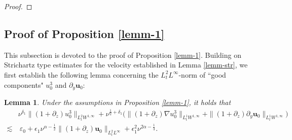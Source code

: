 \documentclass[11pt,reqno]{article}
\newtheorem{lemm}[theo]{Lemma}
\numberwithin{equation}{section}
\newcommand\Z{{\mathbb Z}}
\newcommand\W{{\mathcal W}}
\newcommand\uu{\bm{u}}
\newcommand\FF{\bm{F}}
\let\pa=\partial
\let\al=\alpha
\let\var=\varepsilon
\let\f=\frac
\let\ep=\epsilon
\begin{document}
\begin{proof}



\end{proof}





\subsection{Proof of Proposition \ref{lemm-1}}
This subsection is devoted to the proof of Proposition \ref{lemm-1}. 
Building on Strichartz type estimates for the velocity established in Lemma \ref{lemm-str}, %
we first  establish the following lemma concerning the $L^2_tL^{\infty}$-norm of  ``good components" $u_{0}^3$ and $\pa_y\uu_0:$



\begin{lemm}\label{sec4:lemm-u03}
    Under the assumptions in Proposition \ref{lemm-1}, it holds that
    \begin{align}\label{est-u3-0}
        &\nu^{\delta_1}\|(1+\pa_z)u_0^3\|_{L^2_tW^{1,\infty}}
        +\nu^{\f12+\delta_1}\big(\|(1+\pa_z)\nabla u_0^3\|_{L^1_tW^{1,\infty}}
        +\|(1+\pa_z)\pa_y \uu_0\|_{L^1_tW^{1,\infty}}\big)
        \nonumber
        \\
        \lesssim &~\var_0+\ep_1\nu^{\alpha-\f12} \|(1+\pa_z)\uu_0\|_{L^2_tL^{\infty}}+\ep_1^2\nu^{2\al-\f13}.
    \end{align}
\end{lemm}
\end{document}
